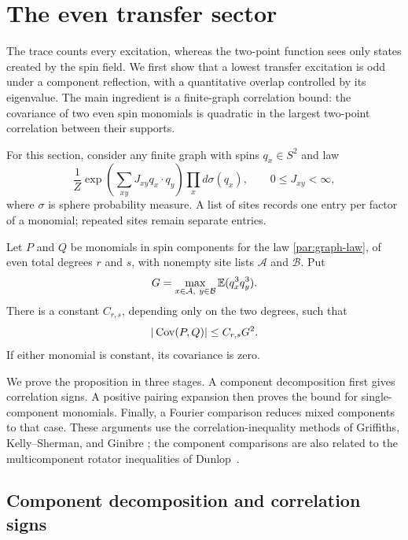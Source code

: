 \section{The even transfer sector}\label{sec:parity}

The trace counts every excitation, whereas the two-point function sees only
states created by the spin field. We first show that a lowest transfer
excitation is odd under a component reflection, with a quantitative overlap
controlled by its eigenvalue. The main ingredient is a finite-graph
correlation bound: the covariance of two even spin monomials is quadratic in
the largest two-point correlation between their supports.

For this section, consider any finite graph with spins $q_x\in S^2$ and law
\begin{equation}\label{par:graph-law}
 \frac1Z\exp\!\left(\sum_{xy}J_{xy}q_x\cdot q_y\right)
       \prod_x d\sigma(q_x),\qquad 0\le J_{xy}<\infty,
\end{equation}
where $\sigma$ is sphere probability measure. A list of sites records one
entry per factor of a monomial; repeated sites remain separate entries.

\begin{proposition}\label{par:covariance}
Let $P$ and $Q$ be monomials in spin components for the law
\eqref{par:graph-law}, of even total degrees $r$ and $s$, with nonempty
site lists $\mathcal A$ and $\mathcal B$. Put
\[
 G=\max_{x\in\mathcal A,\ y\in\mathcal B}\mathbb E(q_x^3q_y^3).
\]
There is a constant $C_{r,s}$, depending only on the two degrees, such that
\begin{equation}\label{par:quadratic-bound}
             |\operatorname{Cov}(P,Q)|\le C_{r,s}G^2.
\end{equation}
If either monomial is constant, its covariance is zero.
\end{proposition}

We prove the proposition in three stages. A component decomposition first
gives correlation signs. A positive pairing expansion then proves the bound
for single-component monomials. Finally, a Fourier comparison reduces mixed
components to that case. These arguments use the correlation-inequality
methods of Griffiths, Kelly--Sherman, and Ginibre
\cite{Griffiths1967,KellySherman1968,Ginibre1970}; the component comparisons
are also related to the multicomponent rotator inequalities of
Dunlop~\cite{Dunlop1976}.

\subsection{Component decomposition and correlation signs}

